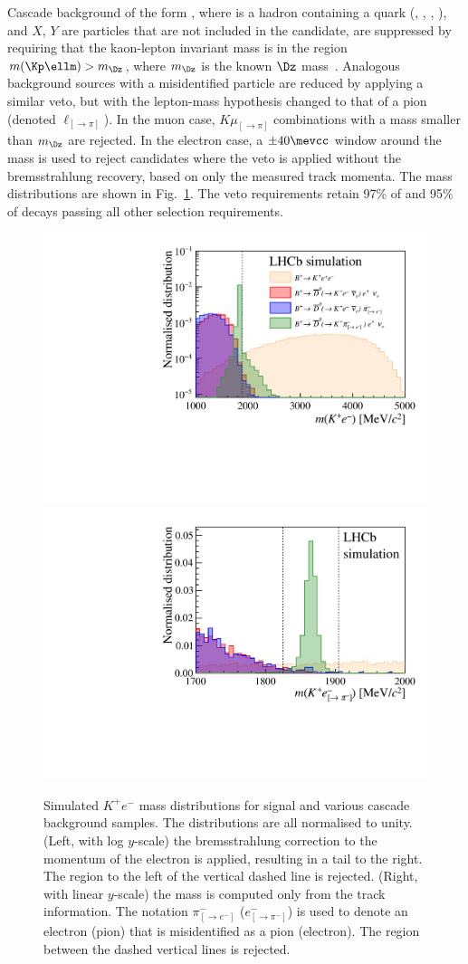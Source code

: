 Cascade background of the form \HbtoHc, where 
\Hc is a hadron containing a \cquark quark (\Dz, \Dp, \Ds, \Lc), and $X$, $Y$ are particles that are not included in the \Bu candidate, are suppressed by requiring that the kaon-lepton invariant mass is in the region \mbox{$m(\Kp\ellm)>m_{\Dz}$}, where $m_{\Dz}$ is the known $\Dz$ mass~\cite{PDG2020}. Analogous background sources with a misidentified particle are reduced by applying a similar veto, but with the lepton-mass hypothesis changed to that of a pion (denoted $\ell_{[\to\pi]}$). In the muon case, $K\mu_{[\to \pi]}$ combinations with a mass smaller than $m_{\Dz}$ are rejected. In the electron case, a $\pm40\mevcc$ window around the \Dz mass is used to reject candidates where the veto is applied without the bremsstrahlung recovery, \ie  based on only the measured track momenta. The mass distributions are shown in Fig.~\ref{fig:cascadeVeto}.  The veto requirements retain 97\% of \BuKmm and 95\% of \BuKee decays passing all other selection requirements. 

\begin{figure}[!tb]
   \begin{center}
      \includegraphics[width=0.48\linewidth]{figures/Fig5a.pdf}
      \includegraphics[width=0.48\linewidth]{figures/Fig5b.pdf}
   \end{center}
    \vspace*{-0.5cm}
   \caption{Simulated $K^+e^-$ mass distributions for  signal and various cascade background samples. The distributions are all normalised to unity.  (Left, with log $y$-scale)
   the bremsstrahlung correction to the momentum of the electron is applied, resulting in a tail to the right. The region to the left of the vertical dashed line is rejected. (Right, with linear $y$-scale) the mass is computed only from the track information. The notation $\pi^-_{[\rightarrow e^-]}$ ($e^-_{[\rightarrow \pi^-]}$) is used to denote an electron (pion) that is misidentified as a pion (electron). The region between the dashed vertical lines is rejected. }\label{fig:cascadeVeto}
\end{figure}

